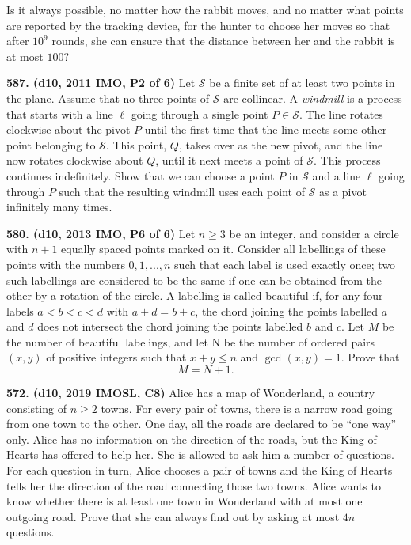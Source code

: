 \documentclass{article}
\begin{document}
Is it always possible, no matter how the rabbit moves, and no matter what points are reported by the tracking device, for the hunter to choose her moves so that after $10^9$ rounds, she can ensure that the distance between her and the rabbit is at most $100$?

\textbf{587. (\color{red}d10\color{black}, 2011 IMO, P2 of 6)} Let $\mathcal{S}$ be a finite set of at least two points in the plane. Assume that no three points of $\mathcal S$ are collinear. A \textit{windmill} is a process that starts with a line $\ell$ going through a single point $P \in \mathcal S$. The line rotates clockwise about the pivot $P$ until the first time that the line meets some other point belonging to $\mathcal S$. This point, $Q$, takes over as the new pivot, and the line now rotates clockwise about $Q$, until it next meets a point of $\mathcal S$. This process continues indefinitely.
Show that we can choose a point $P$ in $\mathcal S$ and a line $\ell$ going through $P$ such that the resulting windmill uses each point of $\mathcal S$ as a pivot infinitely many times.

\textbf{580. (\color{red}d10\color{black}, 2013 IMO, P6 of 6)} Let $n \ge 3$ be an integer, and consider a circle with $n + 1$ equally spaced points marked on it. Consider all labellings of these points with the numbers $0, 1, ... , n$ such that each label is used exactly once; two such labellings are considered to be the same if one can be obtained from the other by a rotation of the circle. A labelling is called beautiful if, for any four labels $a < b < c < d$ with $a + d = b + c$, the chord joining the points labelled $a$ and $d$ does not intersect the chord joining the points labelled $b$ and $c$.
\smallbreak
Let $M$ be the number of beautiful labelings, and let N be the number of ordered pairs $(x, y)$ of positive integers such that $x + y \le n$ and $\gcd(x, y) = 1$. Prove that $$M = N + 1.$$

\textbf{572. (\color{red}d10\color{black}, 2019 IMOSL, C8)} Alice has a map of Wonderland, a country consisting of $n \geq 2$ towns. For every pair of towns, there is a narrow road going from one town to the other. One day, all the roads are declared to be “one way” only. Alice has no information on the direction of the roads, but the King of Hearts has offered to help her. She is allowed to ask him a number of questions. For each question in turn, Alice chooses a pair of towns and the King of Hearts tells her the direction of the road connecting those two towns.
\smallbreak
Alice wants to know whether there is at least one town in Wonderland with at most one outgoing road. Prove that she can always find out by asking at most $4n$ questions.
\end{document}
